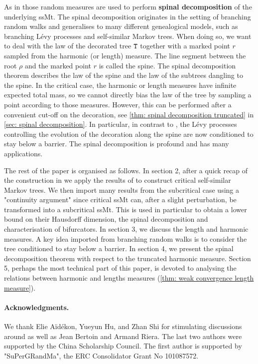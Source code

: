 \documentclass[12pt]{article}
\numberwithin{equation}{section}
\theoremstyle{plain}
\theoremstyle{definition}
\begin{document}
As in  \cite[Chapter 4 ]{BertoinJean2024SMta} those random measures are used to perform \textbf{spinal decomposition} of the underlying ssMt. The spinal decomposition originates in the setting of branching random walks and generalises to many different genealogical models, such as branching L\'evy processes and self-similar Markov trees. When doing so, we want to deal with the law of the decorated tree ${\tt T}$ together with a marked point $r$ sampled from the harmonic (or length) measure. The line segment between the root $\rho$ and the marked point $r$ is called the spine. The spinal decomposition theorem describes the law of the spine and the law of the subtrees dangling to the spine. In the critical case, the harmonic or length measures have infinite expected total mass, so we cannot directly bias the law of the tree by sampling a point according to those measures. However, this can be performed after a convenient cut-off on the decoration, see \cref{thm: spinal decomposition truncated}  in \cref{sec: spinal decomposition}. In particular, in contrast to \cite{BertoinJean2024SMta}, the L\'evy processes controlling the evolution of the decoration along the spine are now conditioned to stay below a barrier. The spinal decomposition is profound and has many applications.

The rest of the paper is organised as follows. In section 2, after a quick recap of the construction in \cite{BertoinJean2024SMta} we apply the results of \cite{AidekonElie2024Bodt} to construct critical self-similar Markov trees. We then import many results from the subcritical case using a "continuity argument" since critical ssMt can, after a slight perturbation, be transformed into a subcritical ssMt. This is used in particular to obtain a lower bound on their Hausdorff dimension, the spinal decomposition and characterisation of bifurcators. In section 3, we discuss the length and harmonic measures. A key idea imported from branching random walks is to consider the tree conditioned to stay below a barrier. In section 4, we present the spinal decomposition theorem with respect to the truncated harmonic measure.  Section 5, perhaps the most technical part of this paper, is devoted to analysing the relations between harmonic and lengths measures (\cref{thm: weak convergence length measure}).

\paragraph{Acknowledgments.} We thank Elie Aïdékon, Yueyun Hu, and Zhan Shi for stimulating discussions around \cite{AidekonElie2024Bodt} as well as Jean Bertoin and Armand Riera. The last two authors were supported by the China Scholarship Council. The first author is supported by "SuPerGRandMa", the ERC Consolidator Grant No 101087572.
\end{document}
